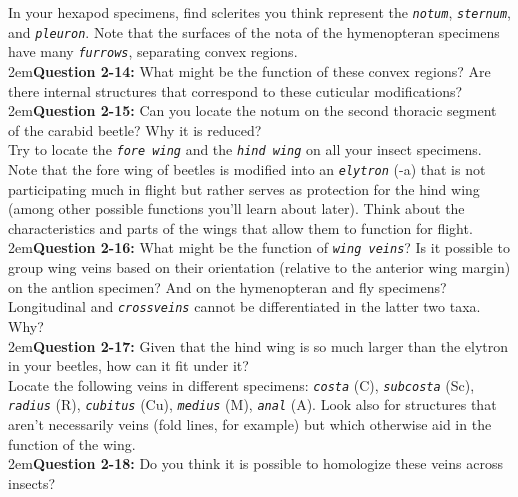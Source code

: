 \documentclass[letterpaper, 11pt]{article}
\newcommand{\latinword}[1]{\texttt{\itshape #1}}%
\begin{document}
\noindent{}In your hexapod specimens, find sclerites you think represent the \latinword{notum}, \latinword{sternum}, and \latinword{pleuron}. Note that the surfaces of the nota of the hymenopteran specimens have many \latinword{furrows}, separating convex regions.\\

\hangindent2em\textbf{Question 2-14:} What might be the function of these convex regions? Are there internal structures that correspond to these cuticular modifications?\\

\hangindent2em\textbf{Question 2-15:} Can you locate the notum on the second thoracic segment of the carabid beetle? Why it is reduced?\\

\noindent{}Try to locate the \latinword{fore wing} and the \latinword{hind wing} on all your insect specimens. Note that the fore wing of beetles is modified into an \latinword{elytron} (-a) that is not participating much in flight but rather serves as protection for the hind wing (among other possible functions you'll learn about later). Think about the characteristics and parts of the wings that allow them to function for flight. \\

\hangindent2em\textbf{Question 2-16:} What might be the function of \latinword{wing veins}? Is it possible to group wing veins based on their orientation (relative to the anterior wing margin) on the antlion specimen? And on the hymenopteran and fly specimens? Longitudinal and \latinword{crossveins} cannot be differentiated in the latter two taxa. Why? \\

\hangindent2em\textbf{Question 2-17:} Given that the hind wing is so much larger than the elytron in your beetles, how can it fit under it?\\

\noindent{}Locate the following veins in different specimens: \latinword{costa} (C), \latinword{subcosta} (Sc), \latinword{radius} (R), \latinword{cubitus} (Cu), \latinword{medius} (M), \latinword{anal} (A). Look also for structures that aren't necessarily veins (fold lines, for example) but which otherwise aid in the function of the wing.\\

\hangindent2em\textbf{Question 2-18:} Do you think it is possible to homologize these veins across insects? \\
\end{document}
